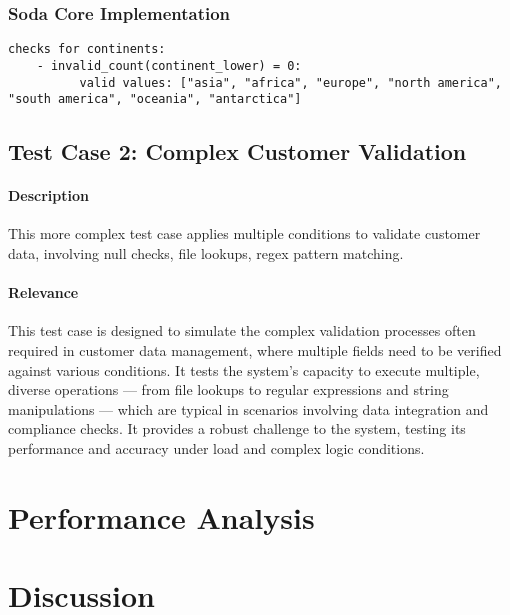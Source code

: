 \subsubsection{Soda Core Implementation}

\begin{verbatim}
checks for continents:
    - invalid_count(continent_lower) = 0:
          valid values: ["asia", "africa", "europe", "north america", "south america", "oceania", "antarctica"]
\end{verbatim}


\subsection{Test Case 2: Complex Customer Validation}

\paragraph{Description} This more complex test case applies multiple conditions to validate customer data, involving null checks, file lookups, regex pattern matching.

\paragraph{Relevance} This test case is designed to simulate the complex validation processes often required in customer data management, where multiple fields need to be verified against various conditions. It tests the system’s capacity to execute multiple, diverse operations — from file lookups to regular expressions and string manipulations — which are typical in scenarios involving data integration and compliance checks. It provides a robust challenge to the system, testing its performance and accuracy under load and complex logic conditions.


\section{Performance Analysis}



\section{Discussion}


